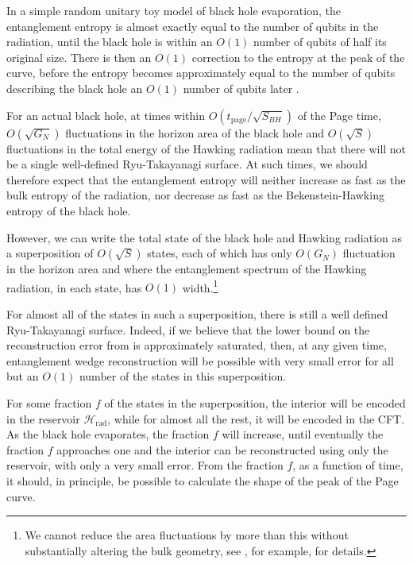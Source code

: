 \documentclass[11pt,a4paper]{article}
\begin{document}
In a simple random unitary toy model of black hole evaporation, the entanglement entropy is almost exactly equal to the number of qubits in the radiation, until the black hole is within an $O(1)$ number of qubits of half its original size. There is then an $O(1)$ correction to the entropy at the peak of the curve, before the entropy becomes approximately equal to the number of qubits describing the black hole an $O(1)$ number of qubits later \cite{page1993average}.

For an actual black hole, at times within $O(t_\text{page}/\sqrt{S_{BH}})$ of the Page time, $O(\sqrt{G_N})$ fluctuations in the horizon area of the black hole and $O(\sqrt{S})$ fluctuations in the total energy of the Hawking radiation mean that there will not be a single well-defined Ryu-Takayanagi surface. At such times, we should therefore expect that the entanglement entropy will neither increase as fast as the bulk entropy of the radiation, nor decrease as fast as the Bekenstein-Hawking entropy of the black hole. 

However, we can write the total state of the black hole and Hawking radiation as a superposition of $O(\sqrt{S})$ states, each of which has only $O(G_N)$ fluctuation in the horizon area and where the entanglement spectrum of the Hawking radiation, in each state, has $O(1)$ width.\footnote{We cannot reduce the area fluctuations by more than this without substantially altering the bulk geometry, see \cite{bao2018beyond, bao2019holographic}, for example, for details.}  

For almost all of the states in such a superposition, there is still a well defined Ryu-Takayanagi surface. Indeed, if we believe that the lower bound on the reconstruction error from \cite{hayden2018learning} is approximately saturated, then, at any given time, entanglement wedge reconstruction will be possible with very small error for all but an $O(1)$ number of the states in this superposition. 

For some fraction $f$ of the states in the superposition, the interior will be encoded in the reservoir $\mathcal{H}_\text{rad}$, while for almost all the rest, it will be encoded in the CFT. As the black hole evaporates, the fraction $f$ will increase, until eventually the fraction $f$ approaches one and the interior can be reconstructed using only the reservoir, with only a very small error. From the fraction $f$, as a function of time, it should, in principle, be possible to calculate the shape of the peak of the Page curve.
\end{document}
